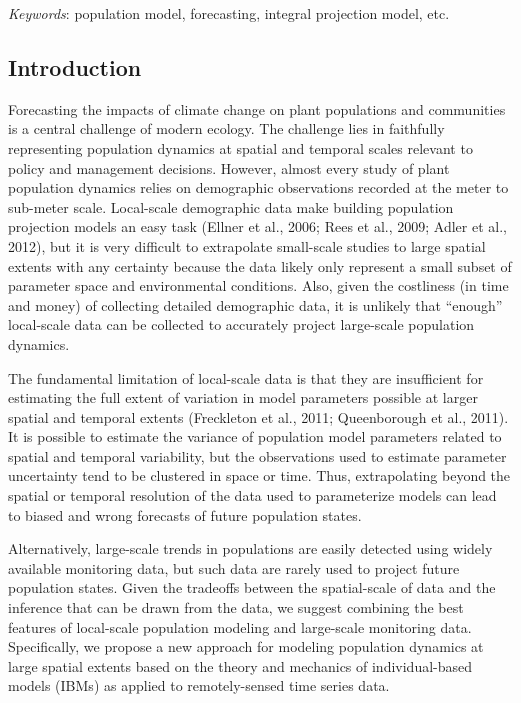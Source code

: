 \documentclass[12pt,]{article}
\begin{document}
\emph{Keywords}: population model, forecasting, integral projection
model, etc.

\subsection{Introduction}\label{introduction}

Forecasting the impacts of climate change on plant populations and
communities is a central challenge of modern ecology. The challenge lies
in faithfully representing population dynamics at spatial and temporal
scales relevant to policy and management decisions. However, almost
every study of plant population dynamics relies on demographic
observations recorded at the meter to sub-meter scale. Local-scale
demographic data make building population projection models an easy task
(Ellner et al., 2006; Rees et al., 2009; Adler et al., 2012), but it is
very difficult to extrapolate small-scale studies to large spatial
extents with any certainty because the data likely only represent a
small subset of parameter space and environmental conditions. Also,
given the costliness (in time and money) of collecting detailed
demographic data, it is unlikely that ``enough'' local-scale data can be
collected to accurately project large-scale population dynamics.

The fundamental limitation of local-scale data is that they are
insufficient for estimating the full extent of variation in model
parameters possible at larger spatial and temporal extents (Freckleton
et al., 2011; Queenborough et al., 2011). It is possible to estimate the
variance of population model parameters related to spatial and temporal
variability, but the observations used to estimate parameter uncertainty
tend to be clustered in space or time. Thus, extrapolating beyond the
spatial or temporal resolution of the data used to parameterize models
can lead to biased and wrong forecasts of future population states.

Alternatively, large-scale trends in populations are easily detected
using widely available monitoring data, but such data are rarely used to
project future population states. Given the tradeoffs between the
spatial-scale of data and the inference that can be drawn from the data,
we suggest combining the best features of local-scale population
modeling and large-scale monitoring data. Specifically, we propose a new
approach for modeling population dynamics at large spatial extents based
on the theory and mechanics of individual-based models (IBMs) as applied
to remotely-sensed time series data.
\end{document}
